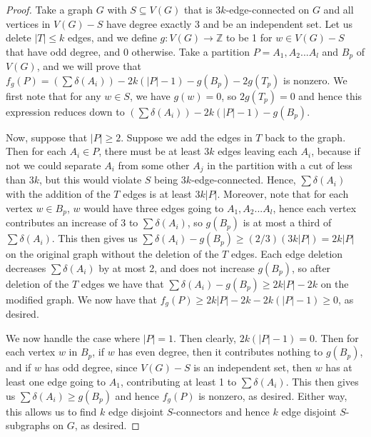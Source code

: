 \documentclass{article}
\begin{document}
\begin{proof}
    Take a graph $G$ with $S \subseteq V(G)$ that is $3k$-edge-connected on $G$ and all vertices in $V(G)-S$ have degree exactly 3 and be an independent set. Let us delete $|T| \leq k$ edges, and we define $g:V(G) \rightarrow \mathbb{Z}$ to be 1 for $w \in V(G)-S$ that have odd degree, and 0 otherwise. Take a partition $P = A_1, A_2...A_l$ and $B_p$ of $V(G)$, and we will prove that $f_g(P) = (\sum \delta(A_i))-2k(|P|-1)-g(B_p)-2g(T_p)$ is nonzero. We first note that for any $w \in S$, we have $g(w) = 0$, so $2g(T_p) = 0$ and hence this expression reduces down to $(\sum \delta(A_i))-2k(|P|-1)-g(B_p)$.

    Now, suppose that $|P| \geq 2$. Suppose we add the edges in $T$ back to the graph. Then for each $A_i \in P$, there must be at least $3k$ edges leaving each $A_i$, because if not we could separate $A_i$ from some other $A_j$ in the partition with a cut of less than $3k$, but this would violate $S$ being $3k$-edge-connected. Hence, $\sum \delta(A_i)$ with the addition of the $T$ edges is at least $3k|P|$. Moreover, note that for each vertex $w \in B_p$, $w$ would have three edges going to $A_1,A_2...A_l$, hence each vertex contributes an increase of 3 to $\sum \delta(A_i)$, so $g(B_p)$ is at most a third of $\sum \delta(A_i)$. This then gives us $\sum \delta(A_i)-g(B_p) \geq (2/3)(3k|P|) = 2k|P|$ on the original graph without the deletion of the $T$ edges. Each edge deletion decreases $\sum \delta(A_i)$ by at most 2, and does not increase $g(B_p)$, so after deletion of the $T$ edges we have that $\sum \delta(A_i)-g(B_p) \geq 2k|P|-2k$ on the modified graph. We now have that $f_g(P) \geq 2k|P|-2k-2k(|P|-1) \geq 0$, as desired. 

    We now handle the case where $|P|=1$. Then clearly, $2k(|P|-1) = 0$. Then for each vertex $w$ in $B_p$, if $w$ has even degree, then it contributes nothing to $g(B_p)$, and if $w$ has odd degree, since $V(G)-S$ is an independent set, then $w$ has at least one edge going to $A_1$, contributing at least 1 to $\sum \delta(A_i)$. This then gives us $\sum \delta(A_i) \geq g(B_p)$ and hence $f_g(P)$ is nonzero, as desired. Either way, this allows us to find $k$ edge disjoint $S$-connectors and hence $k$ edge disjoint $S$-subgraphs on $G$, as desired. 
\end{proof}
\end{document}
